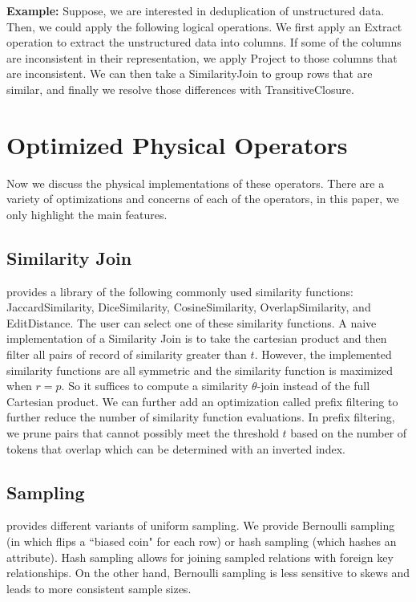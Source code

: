 \vspace{0.5em}
\noindent \textbf{Example: } Suppose, we are interested in deduplication of unstructured data. Then, we could apply the following logical operations.
We first apply an \textsf{Extract} operation to extract the unstructured data into columns. If some of the columns are inconsistent in their representation,
we apply \textsf{Project} to those columns that are inconsistent. We can then take a \textsf{SimilarityJoin} to group rows that are similar, and finally
we resolve those differences with \textsf{TransitiveClosure}.

\section{Optimized Physical Operators}
Now we discuss the physical implementations of these operators.
There are a variety of optimizations and concerns of each of the operators, in this paper, we 
only highlight the main features.

\subsection{Similarity Join} 
\projx provides a library of the following commonly used similarity functions: \textsf{JaccardSimilarity}, \textsf{DiceSimilarity},
\textsf{CosineSimilarity}, \textsf{OverlapSimilarity}, and \textsf{EditDistance}.
The user can select one of these similarity functions.
A naive implementation of a Similarity Join is to take the cartesian product and then filter all pairs of record of similarity greater than $t$.
However, the implemented similarity functions are all symmetric and the similarity function is maximized when $r = p$.
So it suffices to compute a similarity $\theta$-join instead of the full Cartesian product.
We can further add an optimization called prefix filtering to further reduce the number of similarity function evaluations.
In prefix filtering, we prune pairs that cannot possibly meet the threshold $t$ based on the number of tokens that overlap which can be determined with an inverted index.

\subsection{Sampling}
\projx provides different variants of uniform sampling.
We provide Bernoulli sampling (in which flips a ``biased coin" for each row) or hash sampling (which hashes an attribute).
Hash sampling allows for joining sampled relations with foreign key relationships.
On the other hand, Bernoulli sampling is less sensitive to skews and leads to more consistent sample sizes.

